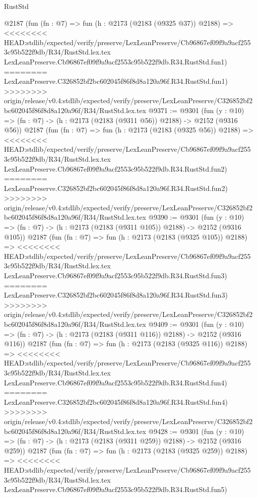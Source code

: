 \begin{lexlean}{RustStd}
\begin{coremodule}
{\begin{coremodule}
{{{{{{{{{{{{{{{    @2187
    (fun (fn : @7) =>
    fun (h : @2173 (@2183 (@9325 @37)) @2188) =>
<<<<<<<< HEAD:stdlib/expected/verify/preserve/LexLeanPreserve/Cb96867ef09f9a9acf2553c95b522f9db/R34/RustStd.lex.tex
    LexLeanPreserve.Cb96867ef09f9a9acf2553c95b522f9db.R34.RustStd.fun1)
========
    LexLeanPreserve.C326852bf2bc602045f86f8d8a120a96f.R34.RustStd.fun1)
>>>>>>>> origin/release/v0.4:stdlib/expected/verify/preserve/LexLeanPreserve/C326852bf2bc602045f86f8d8a120a96f/R34/RustStd.lex.tex
@9371 := @9301
    (fun (y : @10) => (fn : @7) -> (h : @2173 (@2183 (@9311 @56)) @2188) -> @2152 (@9316 @56))
    @2187
    (fun (fn : @7) =>
    fun (h : @2173 (@2183 (@9325 @56)) @2188) =>
<<<<<<<< HEAD:stdlib/expected/verify/preserve/LexLeanPreserve/Cb96867ef09f9a9acf2553c95b522f9db/R34/RustStd.lex.tex
    LexLeanPreserve.Cb96867ef09f9a9acf2553c95b522f9db.R34.RustStd.fun2)
========
    LexLeanPreserve.C326852bf2bc602045f86f8d8a120a96f.R34.RustStd.fun2)
>>>>>>>> origin/release/v0.4:stdlib/expected/verify/preserve/LexLeanPreserve/C326852bf2bc602045f86f8d8a120a96f/R34/RustStd.lex.tex
@9390 := @9301
    (fun (y : @10) => (fn : @7) -> (h : @2173 (@2183 (@9311 @105)) @2188) -> @2152 (@9316 @105))
    @2187
    (fun (fn : @7) =>
    fun (h : @2173 (@2183 (@9325 @105)) @2188) =>
<<<<<<<< HEAD:stdlib/expected/verify/preserve/LexLeanPreserve/Cb96867ef09f9a9acf2553c95b522f9db/R34/RustStd.lex.tex
    LexLeanPreserve.Cb96867ef09f9a9acf2553c95b522f9db.R34.RustStd.fun3)
========
    LexLeanPreserve.C326852bf2bc602045f86f8d8a120a96f.R34.RustStd.fun3)
>>>>>>>> origin/release/v0.4:stdlib/expected/verify/preserve/LexLeanPreserve/C326852bf2bc602045f86f8d8a120a96f/R34/RustStd.lex.tex
@9409 := @9301
    (fun (y : @10) => (fn : @7) -> (h : @2173 (@2183 (@9311 @116)) @2188) -> @2152 (@9316 @116))
    @2187
    (fun (fn : @7) =>
    fun (h : @2173 (@2183 (@9325 @116)) @2188) =>
<<<<<<<< HEAD:stdlib/expected/verify/preserve/LexLeanPreserve/Cb96867ef09f9a9acf2553c95b522f9db/R34/RustStd.lex.tex
    LexLeanPreserve.Cb96867ef09f9a9acf2553c95b522f9db.R34.RustStd.fun4)
========
    LexLeanPreserve.C326852bf2bc602045f86f8d8a120a96f.R34.RustStd.fun4)
>>>>>>>> origin/release/v0.4:stdlib/expected/verify/preserve/LexLeanPreserve/C326852bf2bc602045f86f8d8a120a96f/R34/RustStd.lex.tex
@9428 := @9301
    (fun (y : @10) => (fn : @7) -> (h : @2173 (@2183 (@9311 @259)) @2188) -> @2152 (@9316 @259))
    @2187
    (fun (fn : @7) =>
    fun (h : @2173 (@2183 (@9325 @259)) @2188) =>
<<<<<<<< HEAD:stdlib/expected/verify/preserve/LexLeanPreserve/Cb96867ef09f9a9acf2553c95b522f9db/R34/RustStd.lex.tex
    LexLeanPreserve.Cb96867ef09f9a9acf2553c95b522f9db.R34.RustStd.fun5)
}}}}}}}}}}}}}}}
\end{coremodule}}
\end{coremodule}
\end{lexlean}

